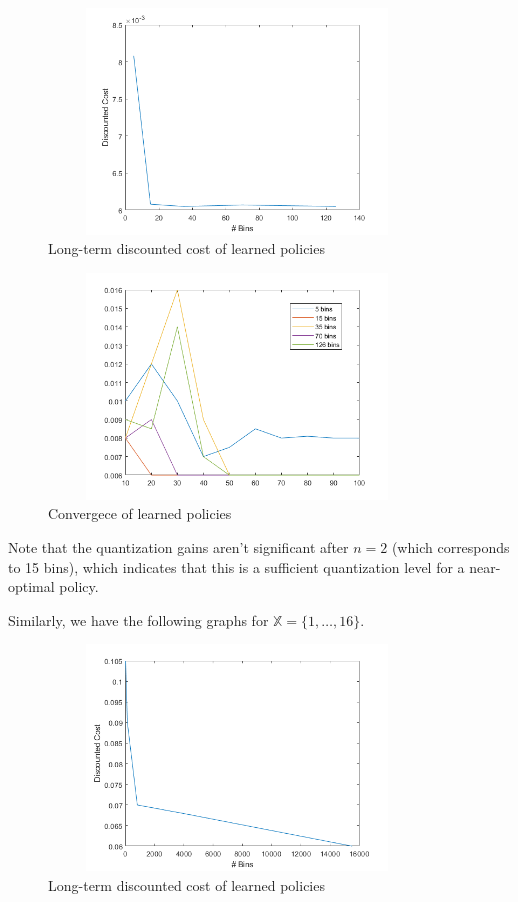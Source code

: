 \documentclass{article}
\begin{document}
\begin{figure}[H]
    \centering
    \includegraphics[height=6cm, width=10cm]{cost_5.png}
    \caption{Long-term discounted cost of learned policies}
\end{figure}

\begin{figure}[H]
    \centering
    \includegraphics[height=6cm, width=10cm]{convergence_5.png}
    \caption{Convergece of learned policies}
\end{figure}

Note that the quantization gains aren't significant after \( n=2 \) (which corresponds to 15 bins), which indicates that this is a sufficient quantization level for a near-optimal policy.

Similarly, we have the following graphs for \( \mathbb{X} = \{1,\ldots,16\} \).

\begin{figure}[H]
    \centering
    \includegraphics[height=6cm, width=10cm]{cost_16.png}
    \caption{Long-term discounted cost of learned policies}
\end{figure}
\end{document}
